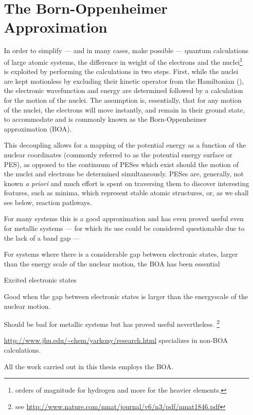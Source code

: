 \section{The Born-Oppenheimer Approximation}
\label{sec:born-oppenheimer}

In order to simplify --- and in many cases, make possible --- quantum calculations of large atomic systems, the difference in weight of the electrons and the nuclei\footnote{ orders of magnitude for hydrogen and more for the heavier elements.} is exploited by performing the calculations in two steps.
First, while the nuclei are kept motionless by excluding their kinetic operator from the Hamiltonian (), the electronic wavefunction and energy are determined followed by a calculation for the motion of the nuclei.
The assumption is, essentially, that for any motion of the nuclei, the electrons will move instantly, and remain in their ground state, to accommodate and is commonly known as the Born-Oppenheimer approximation\cite{born-oppenheimer-1927} (BOA).


This decoupling allows for a mapping of the potential energy as a function of the nuclear coordinates (commonly referred to as the potential energy surface or PES), as opposed to the continuum of PESes which exist should the motion of the nuclei and electrons be determined simultaneously.
PESes are, generally, not known \textit{a priori} and much effort is spent on traversing them to discover interesting features, such as minima, which represent stable atomic structures, or, as we shall see below, reaction pathways.


\bit
\item For many systems this is a good approximation and has even proved useful even for metallic systems --- for which its use could be considered questionable due to the lack of a band gap ---
\item For systems where there is a considerable gap between electronic states, larger than the energy scale of the nuclear motion, the BOA has been essential 
\item Excited electronic states
\item Good when the gap between electronic states is larger than the energyscale of the nuclear motion.
\item Should be bad for metallic systems but has proved useful nevertheless. \footnote{see \url{http://www.nature.com/nmat/journal/v6/n3/pdf/nmat1846.pdf}}
\item \url{http://www.jhu.edu/~chem/yarkony/research.html} specializes in non-BOA calculations.
\eit

All the work carried out in this thesis employs the BOA.
